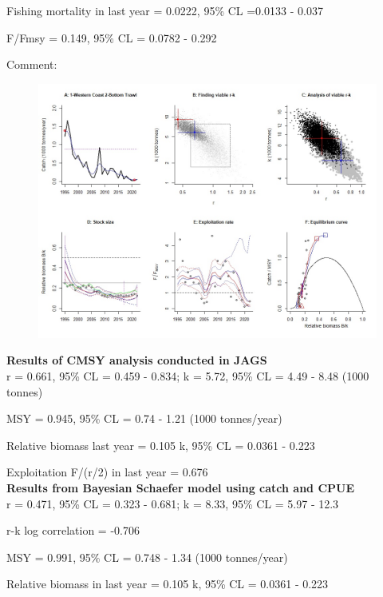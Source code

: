 \documentclass[12pt,a4paper]{article}\usepackage[]{graphicx}\usepackage[]{xcolor}
\begin{document}
Fishing mortality in last year = 0.0222, 95\% CL =0.0133 - 0.037

F/Fmsy  = 0.149, 95\% CL = 0.0782 - 0.292 

 Comment:  

    \pagebreak

    \begin{figure}[ht]
    \centering
    \includegraphics[width=1.00\textwidth ext=.jpg type=jpg]{1-Western Coast 2-Bottom Trawl_AN.jpg}
    \end{figure}

    \textbf{Results of CMSY analysis conducted in JAGS}\\

r = 0.661, 95\% CL = 0.459 - 0.834; k = 5.72, 95\% CL = 4.49 - 8.48 (1000 tonnes)

MSY = 0.945, 95\% CL = 0.74 - 1.21 (1000 tonnes/year)

Relative biomass last year = 0.105 k, 95\% CL = 0.0361 - 0.223

Exploitation F/(r/2) in last year = 0.676 \\

\textbf{Results from Bayesian Schaefer model using catch and CPUE}\\

r = 0.471, 95\% CL = 0.323 - 0.681; k = 8.33, 95\% CL = 5.97 - 12.3

r-k log correlation = -0.706

MSY = 0.991, 95\% CL = 0.748 - 1.34 (1000 tonnes/year)

Relative biomass in last year = 0.105 k, 95\% CL = 0.0361 - 0.223
\end{document}

